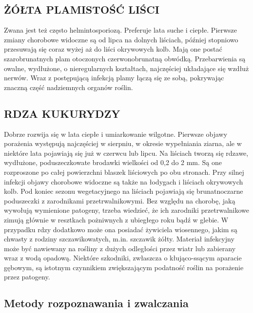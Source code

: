 \documentclass{article}
\begin{document}
\subsection{ŻÓŁTA PLAMISTOŚĆ LIŚCI}
Zwana jest też często helmintosporiozą. Preferuje lata suche i ciepłe. 
Pierwsze zmiany chorobowe widoczne są od lipca na dolnych liściach, później stopniowo przesuwają
się coraz wyżej aż do liści okrywowych kolb. 
Mają one postać szarobrunatnych plam otoczonych czerwonobrunatną obwódką. 
Przebarwienia są owalne, wydłużone, o nieregularnych kształtach, najczęściej układające się wzdłuż
nerwów.
Wraz z postępującą infekcją plamy łączą się ze sobą, pokrywając znaczną część nadziemnych organów 
roślin.

\subsection{RDZA KUKURYDZY}
Dobrze rozwija się w lata ciepłe i umiarkowanie wilgotne. 
Pierwsze objawy porażenia występują najczęściej w sierpniu, w okresie wypełniania ziarna,
ale w niektóre lata pojawiają się już w czerwcu lub lipcu.
Na liściach tworzą się rdzawe, wydłużone, poduszeczkowate brodawki wielkości od 0,2 do 2 mm. 
Są one rozproszone po całej powierzchni blaszek liściowych po obu stronach. 
Przy silnej infekcji objawy chorobowe widoczne są także na łodygach i liściach okrywowych kolb. 
Pod koniec sezonu wegetacyjnego na liściach pojawiają się brunatnoczarne poduszeczki 
z zarodnikami przetrwalnikowymi.
Bez względu na chorobę, jaką wywołują wymienione patogeny, trzeba wiedzieć, że ich zarodniki
przetrwalnikowe zimują głównie w resztkach pożniwnych z ubiegłego roku bądź w glebie. 
W przypadku rdzy dodatkowo może ona posiadać żywiciela wiosennego, jakim są chwasty z rodziny
szczawikowatych, m.in. szczawik żółty.
Materiał infekcyjny może być nawiewany na rośliny z dużych odległości przez wiatr lub zabierany 
wraz z wodą opadową. Niektóre szkodniki, zwłaszcza o kłująco-ssącym aparacie gębowym, 
są istotnym czynnikiem zwiększającym podatność roślin na porażenie przez patogeny.


\subsection{Metody rozpoznawania i zwalczania}
\end{document}
